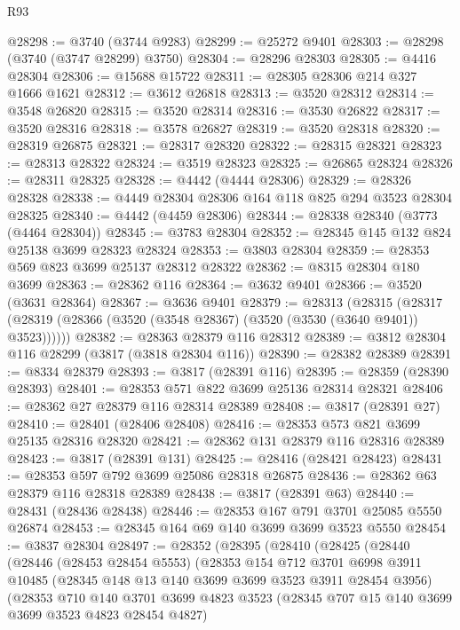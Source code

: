 \begin{lexlean}{R93}
\begin{coremodule}
@28298 := @3740 (@3744 @9283)
@28299 := @25272 @9401
@28303 := @28298 (@3740 (@3747 @28299) @3750)
@28304 := @28296 @28303
@28305 := @4416 @28304
@28306 := @15688 @15722
@28311 := @28305 @28306 @214 @327 @1666 @1621
@28312 := @3612 @26818
@28313 := @3520 @28312
@28314 := @3548 @26820
@28315 := @3520 @28314
@28316 := @3530 @26822
@28317 := @3520 @28316
@28318 := @3578 @26827
@28319 := @3520 @28318
@28320 := @28319 @26875
@28321 := @28317 @28320
@28322 := @28315 @28321
@28323 := @28313 @28322
@28324 := @3519 @28323
@28325 := @26865 @28324
@28326 := @28311 @28325
@28328 := @4442 (@4444 @28306)
@28329 := @28326 @28328
@28338 := @4449 @28304 @28306 @164 @118 @825 @294 @3523 @28304 @28325
@28340 := @4442 (@4459 @28306)
@28344 := @28338 @28340 (@3773 (@4464 @28304))
@28345 := @3783 @28304
@28352 := @28345 @145 @132 @824 @25138 @3699 @28323 @28324
@28353 := @3803 @28304
@28359 := @28353 @569 @823 @3699 @25137 @28312 @28322
@28362 := @8315 @28304 @180 @3699
@28363 := @28362 @116
@28364 := @3632 @9401
@28366 := @3520 (@3631 @28364)
@28367 := @3636 @9401
@28379 := @28313
    (@28315 (@28317 (@28319 (@28366 (@3520 (@3548 @28367) (@3520 (@3530 (@3640 @9401)) @3523))))))
@28382 := @28363 @28379 @116 @28312
@28389 := @3812 @28304 @116 @28299 (@3817 (@3818 @28304 @116))
@28390 := @28382 @28389
@28391 := @8334 @28379
@28393 := @3817 (@28391 @116)
@28395 := @28359 (@28390 @28393)
@28401 := @28353 @571 @822 @3699 @25136 @28314 @28321
@28406 := @28362 @27 @28379 @116 @28314 @28389
@28408 := @3817 (@28391 @27)
@28410 := @28401 (@28406 @28408)
@28416 := @28353 @573 @821 @3699 @25135 @28316 @28320
@28421 := @28362 @131 @28379 @116 @28316 @28389
@28423 := @3817 (@28391 @131)
@28425 := @28416 (@28421 @28423)
@28431 := @28353 @597 @792 @3699 @25086 @28318 @26875
@28436 := @28362 @63 @28379 @116 @28318 @28389
@28438 := @3817 (@28391 @63)
@28440 := @28431 (@28436 @28438)
@28446 := @28353 @167 @791 @3701 @25085 @5550 @26874
@28453 := @28345 @164 @69 @140 @3699 @3699 @3523 @5550
@28454 := @3837 @28304
@28497 := @28352
    (@28395
      (@28410
        (@28425
          (@28440
            (@28446
              (@28453 @28454 @5553)
              (@28353
                @154
                @712
                @3701
                @6998
                @3911
                @10485
                (@28345 @148 @13 @140 @3699 @3699 @3523 @3911 @28454 @3956)
                (@28353
                  @710
                  @140
                  @3701
                  @3699
                  @4823
                  @3523
                  (@28345 @707 @15 @140 @3699 @3699 @3523 @4823 @28454 @4827)

\end{coremodule}
\end{lexlean}
